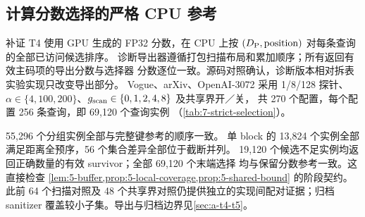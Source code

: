 \subsection{计算分数选择的严格 CPU 参考}
\label{sec:7-strict-selection}

补证 T4 使用 GPU 生成的 FP32 分数，在 CPU 上按
$(D_{\mathrm{P}},\mathrm{position})$ 对每条查询的全部已访问候选排序。
诊断导出器遵循打包扫描布局和累加顺序；所有返回有效主码项的导出分数与选择器
分数逐位一致。源码对照确认，诊断版本相对拆表实验实现只改变导出部分。
Vogue、arXiv、OpenAI-3072 采用 1/8/128 探针、
$\alpha\in\{4,100,200\}$、$g_{\mathrm{scan}}\in\{0,1,2,4,8\}$ 及共享界开／关，
共 270 个配置，每个配置 256 条查询，即 69,120 个查询实例
（\cref{tab:7-strict-selection}）。

\suppressfloats[t]
\begin{table}[htbp]
\centering
\caption[严格计算分数选择检查]{T4 CPU 参考检查。集合及顺序一致使用完整主码键。
有效数量检查 $\min(c,n_c)$ 个 survivor；末端一致性按
$(\refineddist,\mathrm{ID})$ 排序已保留的计算精排分数，包含 FP32 比特比较。
计数为查询实例，同一查询在配置间重复使用。}
\label{tab:7-strict-selection}
\footnotesize\setlength{\tabcolsep}{3pt}

\end{table}

55,296 个分组实例全部与完整键参考的顺序一致。
单 block 的 13,824 个实例全部满足距离全预序，56 个集合差异全部位于截断并列。
19,120 个候选不足实例均返回正确数量的有效 survivor；全部 69,120 个末端选择
均与保留分数参考一致。这直接检查
\cref{lem:5-buffer,prop:5-local-coverage,prop:5-shared-bound} 的阶段契约。
此前 64 个扫描对照及 48 个共享界对照仍提供独立的实现间配对证据；归档 sanitizer
覆盖较小子集。导出与归档边界见\cref{sec:a-t4-t5}。
